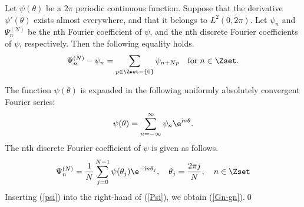 \label{prep of proof 2}
\begin{lem}
\label{LM1}
Let $\psi(\theta)$ be a $2\pi$ periodic continuous function. Suppose that the derivative $\psi'(\theta)$ exists almost everywhere, and that it belongs to $L^2(0,2\pi)$. Let $\psi_n$ and ${\Psi}^{(N)}_n$ be the nth Fourier coefficient of $\psi$, and the nth discrete Fourier coefficients of $\psi$, respectively. Then the following equality holds.
\begin{equation}
{\Psi}^{(N)}_n-\psi_n=\sum _{p\in\Zset-\{0\}}\psi_{n+Np} \quad {\rm for}\; n \in \Zset.
\label{Gn-gn}
\end{equation}
\end{lem}
\begin{pf}
The function $\psi(\theta)$ is expanded in the following uniformly absolutely convergent Fourier series:
\begin{equation}
\psi(\theta)=\sum^{\infty}_{n=-\infty}\psi_n \e^{\mathrm{i} n \theta}.
\label{psi}
\end{equation}
The nth discrete Fourier coefficient of $\psi$ is given as follows.
\begin{equation}
{\Psi}^{(N)}_n=\frac{1}{N}\sum^{N-1}_{j=0}\psi(\theta_j)\e^{-\mathrm{i} n \theta_j}, \quad \theta_j=\frac{2\pi j}{N}, \quad n \in \Zset
\label{Psi}
\end{equation}
Inserting (\ref{psi}) into the right-hand of (\ref{Psi}), we obtain (\ref{Gn-gn}).\qed
\end{pf}

